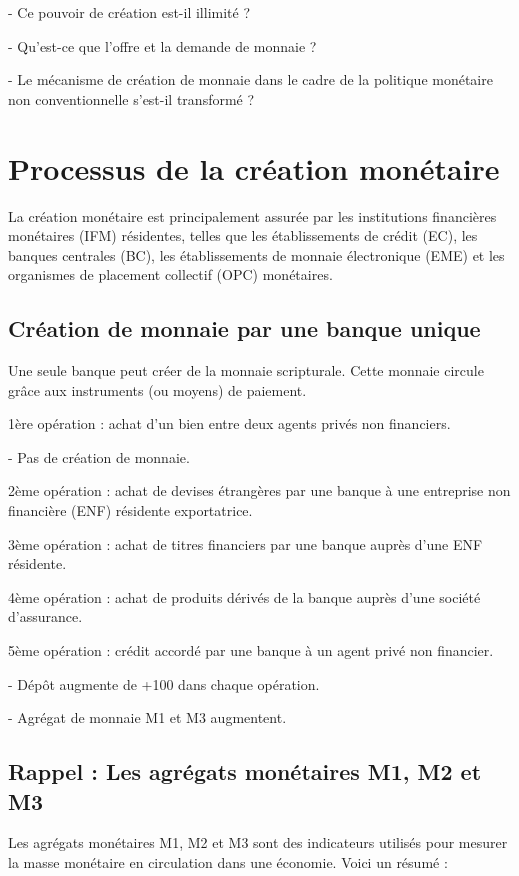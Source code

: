 \documentclass[a4paper, 12pt]{report}
\begin{document}
- Ce pouvoir de création est-il illimité ? 

- Qu'est-ce que l'offre et la demande de monnaie ?

- Le mécanisme de création de monnaie dans le cadre de la politique monétaire non conventionnelle s'est-il transformé ?

\section{Processus de la création monétaire}

La création monétaire est principalement assurée par les institutions financières monétaires (IFM) résidentes, telles que les établissements de crédit (EC), les banques centrales (BC), les établissements de monnaie électronique (EME) et les organismes de placement collectif (OPC) monétaires.

\subsection{Création de monnaie par une banque unique}
	
Une seule banque peut créer de la monnaie scripturale. Cette monnaie circule grâce aux instruments (ou moyens) de paiement.
	
1ère opération : achat d'un bien entre deux agents privés non financiers.  

- Pas de création de monnaie.

2ème opération : achat de devises étrangères par une banque à une entreprise non financière (ENF) résidente exportatrice.

3ème opération : achat de titres financiers par une banque auprès d'une ENF résidente.

4ème opération : achat de produits dérivés de la banque auprès d'une société d'assurance.

5ème opération : crédit accordé par une banque à un agent privé non financier.  

- Dépôt augmente de +100 dans chaque opération.  

- Agrégat de monnaie M1 et M3 augmentent.

\subsection*{Rappel : Les agrégats monétaires M1, M2 et M3}

Les agrégats monétaires M1, M2 et M3 sont des indicateurs utilisés pour mesurer la masse monétaire en circulation dans une économie. Voici un résumé :
\end{document}
